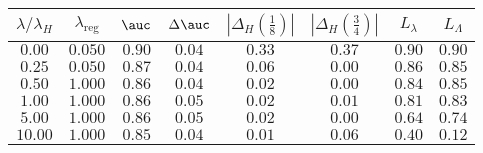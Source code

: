 \begin{tabular}{cccccccc} 
\toprule 
$\lambda / \lambda_H$ & $\lambda_\text{reg}$ & $\auc$ & $\Delta \auc$ 
& $|\Delta_H(\frac{1}{8})|$ & $|\Delta_H(\frac{3}{4})|$ & $L_\lambda$ & $L_\Lambda$ \\ 
\midrule 
$0.00$ & $0.050$ & $0.90$ & $0.04$ & $0.33$ & $0.37$ & $0.90$ & $0.90$ \\ 
$0.25$ & $0.050$ & $0.87$ & $0.04$ & $0.06$ & $0.00$ & $0.86$ & $0.85$ \\ 
$0.50$ & $1.000$ & $0.86$ & $0.04$ & $0.02$ & $0.00$ & $0.84$ & $0.85$ \\ 
$1.00$ & $1.000$ & $0.86$ & $0.05$ & $0.02$ & $0.01$ & $0.81$ & $0.83$ \\ 
$5.00$ & $1.000$ & $0.86$ & $0.05$ & $0.02$ & $0.00$ & $0.64$ & $0.74$ \\ 
$10.00$ & $1.000$ & $0.85$ & $0.04$ & $0.01$ & $0.06$ & $0.40$ & $0.12$ \\ 
\bottomrule 
\end{tabular} 
